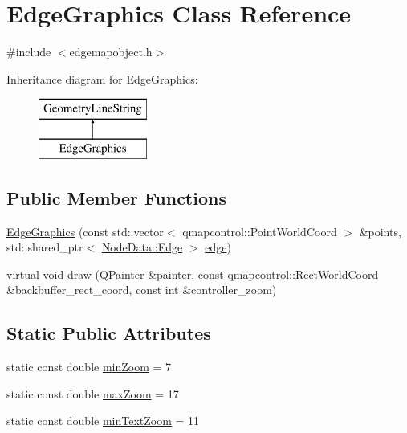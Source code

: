 \hypertarget{class_edge_graphics}{}\section{Edge\+Graphics Class Reference}
\label{class_edge_graphics}


{\ttfamily \#include $<$edgemapobject.\+h$>$}

Inheritance diagram for Edge\+Graphics\+:\begin{figure}[H]
\begin{center}
\leavevmode
\includegraphics[height=2.000000cm]{d3/d0d/class_edge_graphics}
\end{center}
\end{figure}
\subsection*{Public Member Functions}
\begin{DoxyCompactItemize}
\item 
\mbox{\hyperlink{class_edge_graphics_a5d5e0e533ccdccd7e87fb09907ea9e34}{Edge\+Graphics}} (const std\+::vector$<$ qmapcontrol\+::\+Point\+World\+Coord $>$ \&points, std\+::shared\+\_\+ptr$<$ \mbox{\hyperlink{struct_node_data_1_1_edge}{Node\+Data\+::\+Edge}} $>$ \mbox{\hyperlink{structedge}{edge}})
\item 
virtual void \mbox{\hyperlink{class_edge_graphics_a033cd02547ab4e2733cfc1ecdfee8312}{draw}} (Q\+Painter \&painter, const qmapcontrol\+::\+Rect\+World\+Coord \&backbuffer\+\_\+rect\+\_\+coord, const int \&controller\+\_\+zoom)
\end{DoxyCompactItemize}
\subsection*{Static Public Attributes}
\begin{DoxyCompactItemize}
\item 
static const double \mbox{\hyperlink{class_edge_graphics_a74066597dbde5c55a52435f0f5cd5561}{min\+Zoom}} = 7
\item 
static const double \mbox{\hyperlink{class_edge_graphics_a6fa3ef570ccaa725dec8c6686dbdb8bf}{max\+Zoom}} = 17
\item 
static const double \mbox{\hyperlink{class_edge_graphics_a482e4a1683f7c08759a834be14b4d741}{min\+Text\+Zoom}} = 11
\end{DoxyCompactItemize}


